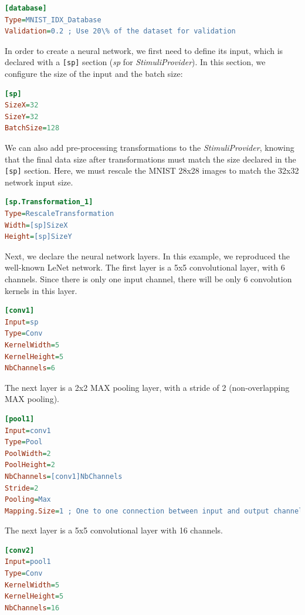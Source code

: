 \documentclass[a4paper,11pt,oneside]{article}
\begin{document}
\begin{lstlisting}[language=ini]
[database]
Type=MNIST_IDX_Database
Validation=0.2 ; Use 20\% of the dataset for validation
\end{lstlisting}

In order to create a neural network, we first need to define its input, which is
declared with a \lstinline![sp]! section (\emph{sp} for \emph{StimuliProvider}).
In this section, we configure the size of the input and the batch size:

\begin{lstlisting}[language=ini]
[sp]
SizeX=32
SizeY=32
BatchSize=128
\end{lstlisting}

We can also add pre-processing transformations to the \emph{StimuliProvider},
knowing that the final data size after transformations must match the size
declared in the \lstinline![sp]! section. Here, we must rescale the MNIST 28x28
images to match the 32x32 network input size.

\begin{lstlisting}[language=ini]
[sp.Transformation_1]
Type=RescaleTransformation
Width=[sp]SizeX
Height=[sp]SizeY
\end{lstlisting}

Next, we declare the neural network layers. In this example, we reproduced the
well-known LeNet network. The first layer is a 5x5 convolutional layer, with
6 channels. Since there is only one input channel, there will be only 6
convolution kernels in this layer.

\begin{lstlisting}[language=ini]
[conv1]
Input=sp
Type=Conv
KernelWidth=5
KernelHeight=5
NbChannels=6
\end{lstlisting}

The next layer is a 2x2 MAX pooling layer, with a stride of 2 (non-overlapping
MAX pooling).

\begin{lstlisting}[language=ini]
[pool1]
Input=conv1
Type=Pool
PoolWidth=2
PoolHeight=2
NbChannels=[conv1]NbChannels
Stride=2
Pooling=Max
Mapping.Size=1 ; One to one connection between input and output channels
\end{lstlisting}

The next layer is a 5x5 convolutional layer with 16 channels.

\begin{lstlisting}[language=ini]
[conv2]
Input=pool1
Type=Conv
KernelWidth=5
KernelHeight=5
NbChannels=16
\end{lstlisting}
\end{document}
